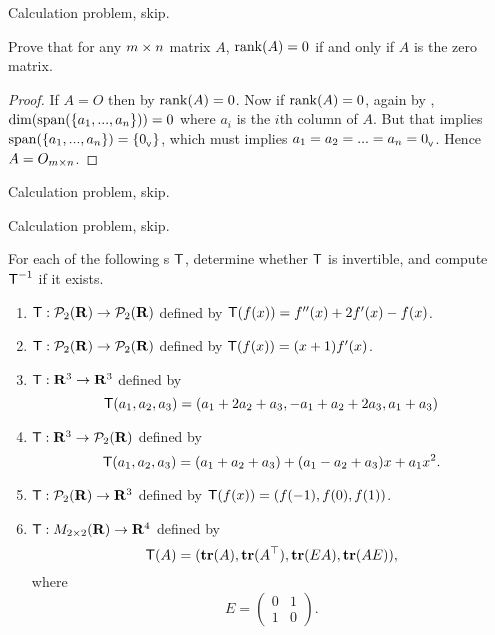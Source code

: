 \begin{exercise} \label{exercise 3.2.2}
Calculation problem, skip.
\end{exercise}


\begin{exercise} \label{exercise 3.2.3}
Prove that for any \(m \times n\) matrix \(A\), \(\mathrm{rank}(A) = 0\) if and only if \(A\) is the zero matrix.
\end{exercise}

\begin{proof}
If \(A = O\) then by  \(\mathrm{rank}(A) = 0\).
Now if \(\mathrm{rank}(A) = 0\), again by , \(\dim(\operatorname{span}(\{a_1, ..., a_n\})) = 0\) where \(a_i\) is the \(i\)th column of \(A\).
But that implies \(\operatorname{span}(\{a_1, ..., a_n\}) = \{ 0_{_{\textsf{V}}} \}\), which must implies \(a_1 = a_2 = ... = a_n = 0_{_{\textsf{V}}}\).
Hence \(A = O_{m \times n}\).
\end{proof}

\begin{exercise} \label{exercise 3.2.4}
Calculation problem, skip.
\end{exercise}

\begin{exercise} \label{exercise 3.2.5}
Calculation problem, skip.
\end{exercise}

\begin{exercise} \label{exercise 3.2.6}
For each of the following \LTRAN{}s \(\textsf{T}\), determine whether \(\textsf{T}\) is invertible, and compute \(\textsf{T}^{-1}\) if it exists.
\begin{enumerate}
\item \(\textsf{T}: \mathcal{P}_{2}(\mathbf{R}) \to \mathcal{P}_{2}(\mathbf{R})\) defined by \(\textsf{T}(f(x)) = f''(x) + 2f'(x) - f(x)\).

\item \(\textsf{T}:\mathcal{P}_{2}(\mathbf{R}) \to \mathcal{P}_{2}(\mathbf{R})\) defined by \(\textsf{T}(f(x)) = (x + 1) f'(x)\).

\item \(\textsf{T}: \mathbf{R}^{3} \to \mathbf{R}^{3}\) defined by
\[
    \textsf{T}(a_1, a_2, a_3) = (a_1 + 2 a_2 + a_3, - a_1 + a_2 + 2 a_3, a_1 + a_3)
\]

\item \(\textsf{T}: \mathbf{R}^{3} \to \mathcal{P}_{2}(\mathbf{R})\) defined by
\[
    \textsf{T}(a_1, a_2, a_3) = (a_1 + a_2 + a_3) + (a_1 - a_2 + a_3)x + a_1 x^2.
\]

\item \(\textsf{T}: \mathcal{P}_{2}(\mathbf{R}) \to \mathbf{R}^{3}\) defined by  \(\textsf{T}(f(x)) = (f(-1), f(0), f(1))\).

\item \(\textsf{T}: M_{2 \times 2}(\mathbf{R}) \to \mathbf{R}^4\) defined by
\[
    \textsf{T}(A)= (\textbf{tr}(A), \textbf{tr}(A^\top), \textbf{tr}(EA), \textbf{tr}(AE)),
\]
where
\[
    E = \begin{pmatrix} 0 & 1 \\ 1 & 0 \end{pmatrix}.
\]
\end{enumerate}
\end{exercise}

